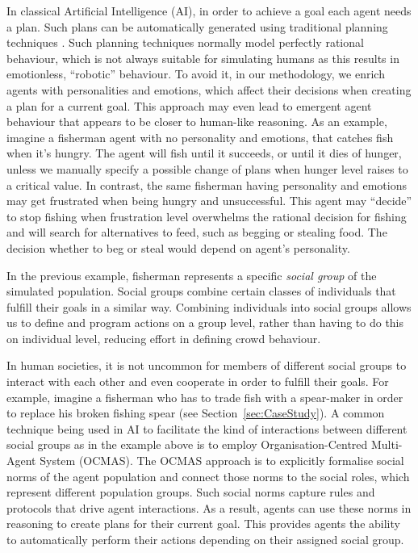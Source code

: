 In classical Artificial Intelligence (AI), in order to achieve a goal each agent needs a plan. Such plans can be automatically generated using traditional planning techniques \cite{shehory1999} \cite{braubach2005}. Such planning techniques normally model perfectly rational behaviour, which is not always suitable for simulating humans as this results in emotionless, ``robotic'' behaviour. To avoid it, in our methodology, we enrich agents with personalities and emotions, which affect their decisions when creating a plan for a current goal. This approach may even lead to emergent agent behaviour that appears to be closer to human-like reasoning. As an example, imagine a fisherman agent with no personality and emotions, that catches fish when it's hungry. The agent will fish until it succeeds, or until it dies of hunger, unless we manually specify a possible change of plans when hunger level raises to a critical value. In contrast, the same fisherman having personality and emotions may get frustrated when being hungry and unsuccessful. This agent may ``decide'' to stop fishing when frustration level overwhelms the rational decision for fishing and will search for alternatives to feed, such as begging or stealing food. The decision whether to beg or steal would depend on agent's personality.

In the previous example, fisherman represents a specific \textit{social group} of the simulated population. Social groups combine certain classes of individuals that fulfill their goals in a similar way. Combining individuals into social groups allows us to define and program actions on a group level, rather than having to do this on individual level, reducing effort in defining crowd behaviour. 

In human societies, it is not uncommon for members of different social groups to interact with each other and even cooperate in order to fulfill their goals. For example, imagine a fisherman who has to trade fish with a spear-maker in order to replace his broken fishing spear (see Section~\ref{sec:CaseStudy}). A common technique being used in AI to facilitate the kind of interactions between different social groups as in the example above is to employ Organisation-Centred Multi-Agent System (OCMAS). The OCMAS approach is to explicitly formalise social norms of the agent population and connect those norms to the social roles, which represent different population groups. Such social norms capture rules and protocols that drive agent interactions. As a result, agents can use these norms in reasoning to create plans for their current goal. This provides agents the ability to automatically perform their actions depending on their assigned social group.



